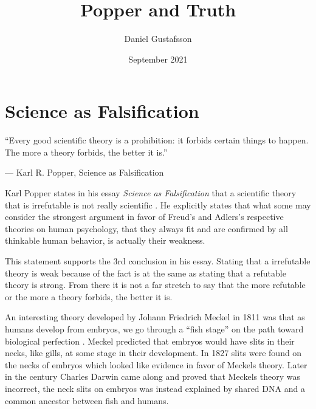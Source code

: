 \documentclass[11pt,a4paper]{article}
\begin{document}
\title{Popper and Truth}
\author{Daniel Gustafsson}
\date{September 2021}
\maketitle
	
\section{Science as Falsification}
\epigraph{``Every good scientific theory is a prohibition: it forbids certain things to happen. The more a theory forbids, the better it is.''}{--- \textup{Karl R. Popper}, Science as Falsification}

Karl Popper states in his essay \textit{Science as Falsification} that a scientific theory that is irrefutable is not really scientific \cite{saf}.
He explicitly states that what some may consider the strongest argument in favor of Freud's and Adlers's respective theories on human psychology,
that they always fit and are confirmed by all thinkable human behavior, is actually their weakness.

This statement supports the 3rd conclusion in his essay. 
Stating that a irrefutable theory is weak because of the fact is at the same as stating that a refutable theory is strong.
From there it is not a far stretch to say that the more refutable or the more a theory forbids, the better it is.

An interesting theory developed by Johann Friedrich Meckel in 1811 was that as humans develop from embryos, we go through a ``fish stage'' on the
path toward biological perfection \cite{fish}. Meckel predicted that embryos would have slits in their necks, like gills, at some stage in their development.
In 1827 slits were found on the necks of embryos which looked like evidence in favor of Meckels theory.
Later in the century Charles Darwin came along and proved that Meckels theory was incorrect, the neck slits on embryos was instead explained by 
shared DNA and a common ancestor between fish and humans. 
\end{document}
